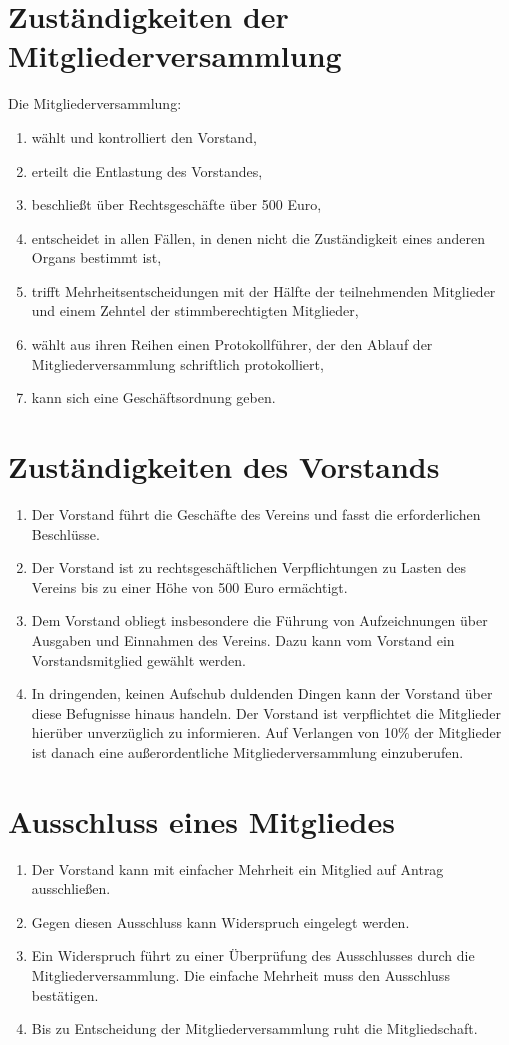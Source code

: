 \documentclass[ngerman]{article}
\begin{document}
\section{Zuständigkeiten der Mitgliederversammlung}
Die Mitgliederversammlung:
\begin{enumerate}
  \item wählt und kontrolliert den Vorstand,
  \item erteilt die Entlastung des Vorstandes,
  \item beschließt über Rechtsgeschäfte über 500 Euro,
  \item entscheidet in allen Fällen, in denen nicht die Zuständigkeit eines anderen Organs bestimmt ist,
  \item trifft Mehrheitsentscheidungen mit der Hälfte der teilnehmenden Mitglieder und einem Zehntel der stimmberechtigten Mitglieder,
  \item wählt aus ihren Reihen einen Protokollführer, der den Ablauf der Mitgliederversammlung schriftlich protokolliert,
  \item kann sich eine Geschäftsordnung geben.
\end{enumerate}

\section{Zuständigkeiten des Vorstands}
\begin{enumerate}
  \item Der Vorstand führt die Geschäfte des Vereins und fasst die erforderlichen Beschlüsse.
  \item Der Vorstand ist zu rechtsgeschäftlichen Verpflichtungen zu Lasten des Vereins bis zu einer Höhe von 500 Euro ermächtigt.
  \item Dem Vorstand obliegt insbesondere die Führung von Aufzeichnungen über Ausgaben und Einnahmen des Vereins.
  Dazu kann vom Vorstand ein Vorstandsmitglied gewählt werden.
  \item In dringenden, keinen Aufschub duldenden Dingen kann der Vorstand über diese Befugnisse hinaus handeln.
  Der Vorstand ist verpflichtet die Mitglieder hierüber unverzüglich zu informieren.
  Auf Verlangen von 10\% der Mitglieder ist danach eine außerordentliche Mitgliederversammlung einzuberufen.
\end{enumerate}

\section{Ausschluss eines Mitgliedes}
\begin{enumerate}
  \item Der Vorstand kann mit einfacher Mehrheit ein Mitglied auf Antrag ausschließen.
  \item Gegen diesen Ausschluss kann Widerspruch eingelegt werden.
  \item Ein Widerspruch führt zu einer Überprüfung des Ausschlusses durch die Mitgliederversammlung. Die einfache Mehrheit muss den Ausschluss bestätigen.
\item Bis zu Entscheidung der Mitgliederversammlung ruht die Mitgliedschaft.
\end{enumerate}
\end{document}
